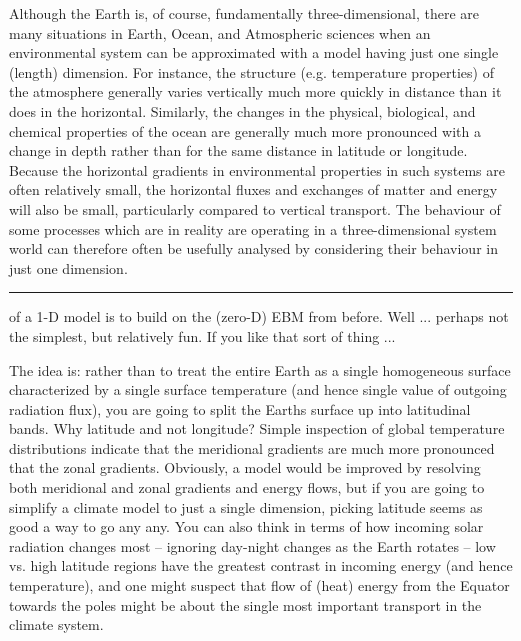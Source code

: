 \documentclass{tufte-book} %
\begin{document}
Although the Earth is, of course, fundamentally three-dimensional, there are many situations in Earth, Ocean, and Atmospheric sciences when an environmental system can be approximated with a model having just one single (length) dimension. For instance, the structure (e.g. temperature properties) of the atmosphere generally varies vertically much more quickly in distance than it does in the horizontal. Similarly, the changes in the physical, biological, and chemical properties of the ocean are generally much more pronounced with a change in depth rather than for the same distance in latitude or longitude. Because the horizontal gradients in environmental properties in such systems are often relatively small, the horizontal fluxes and exchanges of matter and energy will also be small, particularly compared to vertical transport. The behaviour of some processes which are in reality are operating in a three-dimensional system world can therefore often be usefully analysed by considering their behaviour in just one dimension.

\noindent\rule[0.0ex]{0.5\linewidth}{0.5pt}

 of a 1-D model is to build on the (zero-D) EBM from before. Well ... perhaps not the simplest, but relatively fun. If you like that sort of thing ...

The idea is: rather than to treat the entire Earth  as a single homogeneous surface characterized by a single surface temperature (and hence single value of outgoing radiation flux), you are going to split the Earths surface up into latitudinal bands. Why latitude and not longitude? Simple inspection of global temperature distributions indicate that the meridional gradients are much more pronounced that the zonal gradients. Obviously, a model would be improved by resolving both meridional and zonal gradients and energy flows, but if you are going to simplify a climate model to just a single dimension, picking latitude seems as good a way to go any any. You can also think in terms of how incoming solar radiation changes most -- ignoring day-night changes as the Earth rotates -- low vs. high latitude regions have the greatest contrast in incoming energy (and hence temperature), and one might suspect that flow of (heat) energy from the Equator towards the poles might be about the single most important transport in the climate system.
\end{document}
